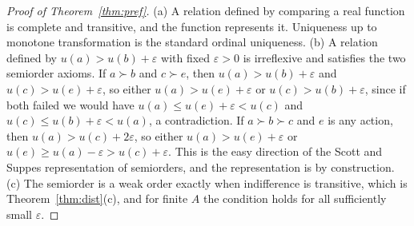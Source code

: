 \documentclass{article}
\theoremstyle{definition}
\theoremstyle{remark}
\begin{document}
\begin{proof}[Proof of Theorem~\ref{thm:pref}]
(a) A relation defined by comparing a real function is complete and transitive, and the function represents it. Uniqueness up to monotone transformation is the standard ordinal uniqueness.
(b) A relation defined by $u(a)>u(b)+\varepsilon$ with fixed $\varepsilon>0$ is irreflexive and satisfies the two semiorder axioms.
If $a\succ b$ and $c\succ e$, then $u(a)>u(b)+\varepsilon$ and $u(c)>u(e)+\varepsilon$, so either $u(a)>u(e)+\varepsilon$ or $u(c)>u(b)+\varepsilon$, since if both failed we would have $u(a)\le u(e)+\varepsilon<u(c)$ and $u(c)\le u(b)+\varepsilon<u(a)$, a contradiction.
If $a\succ b\succ c$ and $e$ is any action, then $u(a)>u(c)+2\varepsilon$, so either $u(a)>u(e)+\varepsilon$ or $u(e)\ge u(a)-\varepsilon>u(c)+\varepsilon$.
This is the easy direction of the Scott and Suppes representation of semiorders, and the representation is by construction.
(c) The semiorder is a weak order exactly when indifference is transitive, which is Theorem~\ref{thm:dist}(c), and for finite $A$ the condition holds for all sufficiently small $\varepsilon$.
\end{proof}
\end{document}
